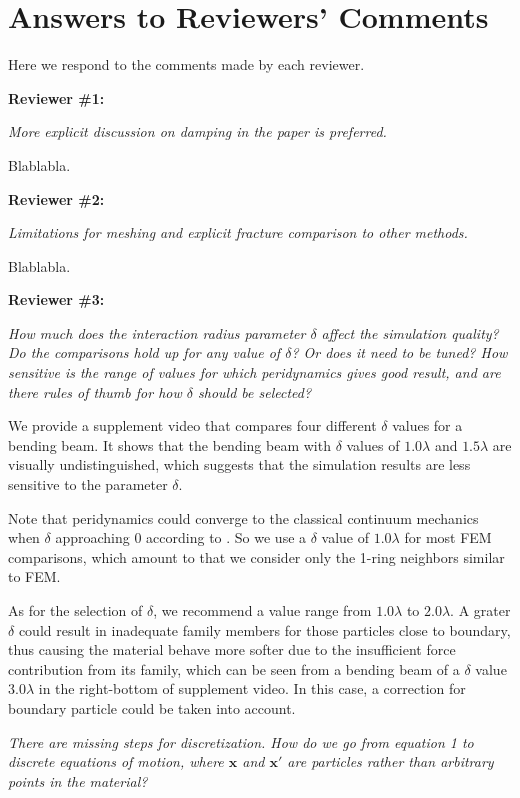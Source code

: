 \section{Answers to Reviewers' Comments}

Here we respond to the comments made by each reviewer.

\noindent{}\textbf{Reviewer \#1:}

\emph{More explicit discussion on damping in the paper is preferred.}

Blablabla.

\noindent{}\textbf{Reviewer \#2:}

\emph{Limitations for meshing and explicit fracture comparison to other methods.}

Blablabla.

\noindent{}\textbf{Reviewer \#3:}

\emph{How much does the interaction radius parameter $\delta$ affect the simulation quality? Do the comparisons hold up for any value of $\delta$? Or does it need to be tuned? How sensitive is the range of values for which peridynamics gives good result, and are there rules of thumb for how $\delta$ should be selected?}

We provide a supplement video that compares four different $\delta$ values for a bending beam. It shows that the bending beam with $\delta$ values of $1.0\lambda$ and $1.5\lambda$ are visually undistinguished, which suggests that the simulation results are less sensitive to the parameter $\delta$.

Note that peridynamics could converge to the classical continuum mechanics when $\delta$ approaching 0 according to \cite{Weckner2005705}. So we use a $\delta$ value of $1.0\lambda$ for most FEM comparisons, which amount to that we consider only the 1-ring neighbors similar to FEM.

As for the selection of $\delta$, we recommend a value range from $1.0\lambda$ to $2.0\lambda$.
A grater $\delta$ could result in inadequate family members for those particles close to boundary, thus causing the material behave more softer due to the insufficient force contribution from its family, which can be seen from a bending beam of a $\delta$ value $3.0\lambda$ in the right-bottom of supplement video.
In this case, a correction for boundary particle could be taken into account.

\emph{There are missing steps for discretization. How do we go from equation 1 to discrete equations of motion, where $\mathbf{x}$ and $\mathbf{x'}$ are particles rather than arbitrary points in the material? }

